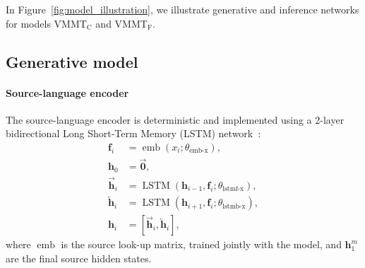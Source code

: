 \documentclass[11pt,a4paper]{article}
\DeclareMathOperator{\emb}{emb}
\DeclareMathOperator{\LSTM}{LSTM}
\newcommand{\cond}{VMMT$_{\text{C}}$\xspace}
\newcommand{\uncond}{VMMT$_{\text{F}}$\xspace}
\begin{document}
In Figure~\ref{fig:model_illustration}, we illustrate generative and inference networks for models \cond and \uncond.





\subsection{Generative model}
\paragraph{Source-language encoder}
The source-language encoder is deterministic and implemented using a 2-layer bidirectional Long Short-Term Memory (LSTM) network~\citep{HochreiterSchmidhuber1997_LSTM}:
\begin{equation}\label{eq:source_language_encoder}
\begin{aligned}
    \bm{f}_i &= \emb(x_i; \theta_\text{emb-x}), \\
    \bm{h}_0 &= \bm{\vec{0}}, \\
    \bm{\overrightarrow{h}}_i &= \LSTM(\bm{h}_{i-1}, \bm{f}_i; \theta_\text{lstmf-x}), \\
    \bm{\overleftarrow{h}}_i &= \LSTM(\bm{h}_{i+1}, \bm{f}_i; \theta_\text{lstmb-x}), \\
    \bm{h}_i &= [\bm{\overrightarrow{h}}_i, \bm{\overleftarrow{h}}_i],
\end{aligned}
\end{equation}
where $\emb$ is the source look-up matrix, trained jointly with the model, and $\bm{h}_1^m$ are the final source hidden states.
\end{document}
